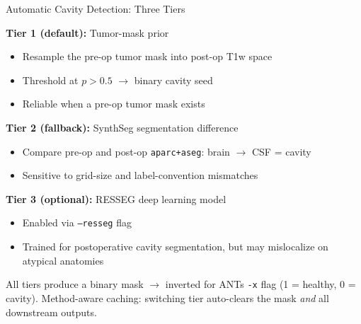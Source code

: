 \begin{frame}{Automatic Cavity Detection: Three Tiers}

  \textbf{Tier 1 (default):} Tumor-mask prior
  \begin{itemize}
    \item Resample the pre-op tumor mask into post-op T1w space
    \item Threshold at $p > 0.5$ $\to$ binary cavity seed
    \item Reliable when a pre-op tumor mask exists
  \end{itemize}

  \medskip

  \textbf{Tier 2 (fallback):} SynthSeg segmentation difference
  \begin{itemize}
    \item Compare pre-op and post-op \texttt{aparc+aseg}: brain $\to$
      CSF = cavity
    \item Sensitive to grid-size and label-convention mismatches
  \end{itemize}

  \medskip

  \textbf{Tier 3 (optional):} RESSEG deep learning model
  \cite{PerezGarcia2021}
  \begin{itemize}
    \item Enabled via \texttt{--resseg} flag
    \item Trained for postoperative cavity segmentation, but may
      mislocalize on atypical anatomies
  \end{itemize}

  \medskip

  All tiers produce a binary mask $\to$ inverted for ANTs \texttt{-x}
  flag (1 = healthy, 0 = cavity).
  Method-aware caching: switching tier auto-clears the mask
  \emph{and} all downstream outputs.

\end{frame}

